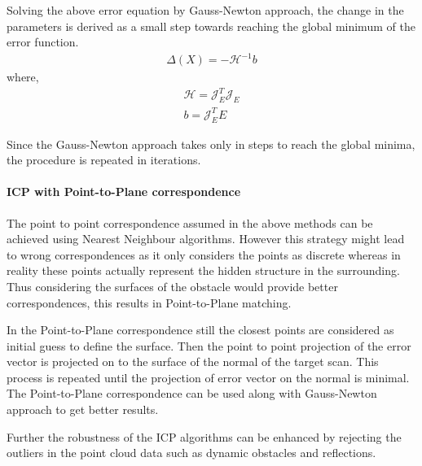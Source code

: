 Solving the above error equation by Gauss-Newton approach, the change in the parameters is derived as a small step towards reaching the global minimum of the error function.
\begin{gather}
    \Delta(X) = -\mathcal{H}^{-1} b
\end{gather}
    where,
\begin{gather}
    \mathcal{H} = \mathcal{J}_E^{T}\mathcal{J}_E\\
    b = \mathcal{J}_E^{T} E
\end{gather}

Since the Gauss-Newton approach takes only in steps to reach the global minima, the procedure is repeated in iterations.
\par
\paragraph{ICP with Point-to-Plane correspondence}
The point to point correspondence assumed in the above methods can be achieved using Nearest Neighbour algorithms. However this strategy might lead to wrong correspondences as it only considers the points as discrete whereas in reality these points actually represent the hidden structure in the surrounding. Thus considering the surfaces of the obstacle would provide better correspondences, this results in Point-to-Plane matching.
\par
In the Point-to-Plane correspondence still the closest points are considered as initial guess to define the surface. Then the point to point projection of the error vector is projected on to the surface of the normal of the target scan. This process is repeated until the projection of error vector on the normal is minimal. The Point-to-Plane correspondence can be used along with Gauss-Newton approach to get better results.
\par
Further the robustness of the ICP algorithms can be enhanced by rejecting the outliers in the point cloud data such as dynamic obstacles and reflections.

